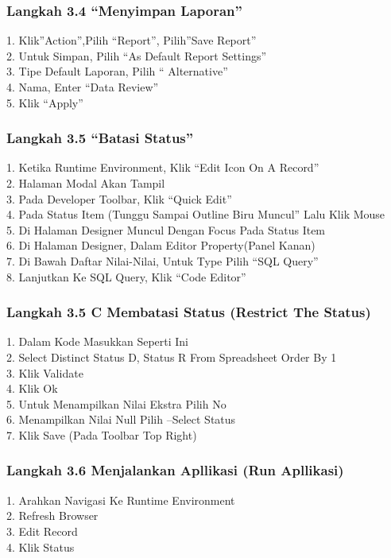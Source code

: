 \documentclass{article}
\begin{document}
{\subsubsection{Langkah 3.4 “Menyimpan Laporan”}
1.	Klik”Action”,Pilih “Report”, Pilih”Save Report”\\
2.	Untuk Simpan, Pilih “As Default Report Settings”\\
3.	Tipe Default Laporan, Pilih “ Alternative”\\
4.	Nama, Enter “Data Review”\\
5.	Klik “Apply”\\
\subsubsection{Langkah 3.5 “Batasi Status”}
1.	Ketika Runtime Environment, Klik “Edit Icon On A Record”\\
2.	Halaman Modal Akan Tampil\\
3.	Pada Developer Toolbar, Klik “Quick Edit”\\
4.	Pada Status Item (Tunggu Sampai Outline Biru Muncul” Lalu Klik Mouse\\
5.	Di Halaman Designer Muncul Dengan Focus Pada Status Item\\
6.	Di Halaman Designer, Dalam Editor Property(Panel Kanan)\\
7.	Di Bawah Daftar Nilai-Nilai, Untuk Type Pilih “SQL Query”\\
8.	Lanjutkan Ke SQL Query, Klik “Code Editor”\\
\subsubsection{
Langkah 3.5 C
Membatasi Status (Restrict The Status)}
1.	Dalam Kode Masukkan Seperti Ini\\
2.	Select Distinct Status D, Status R From Spreadsheet Order By 1\\
3.	Klik Validate\\
4.	Klik Ok\\
5.	Untuk Menampilkan Nilai Ekstra Pilih No\\
6.	Menampilkan Nilai Null Pilih –Select Status\\
7.	Klik Save (Pada Toolbar Top Right)
\subsubsection{Langkah 3.6
Menjalankan Apllikasi (Run Apllikasi)}
1.	Arahkan Navigasi Ke Runtime Environment\\
2.	Refresh Browser\\
3.	Edit Record\\
4.	Klik Status
}
\end{document}
